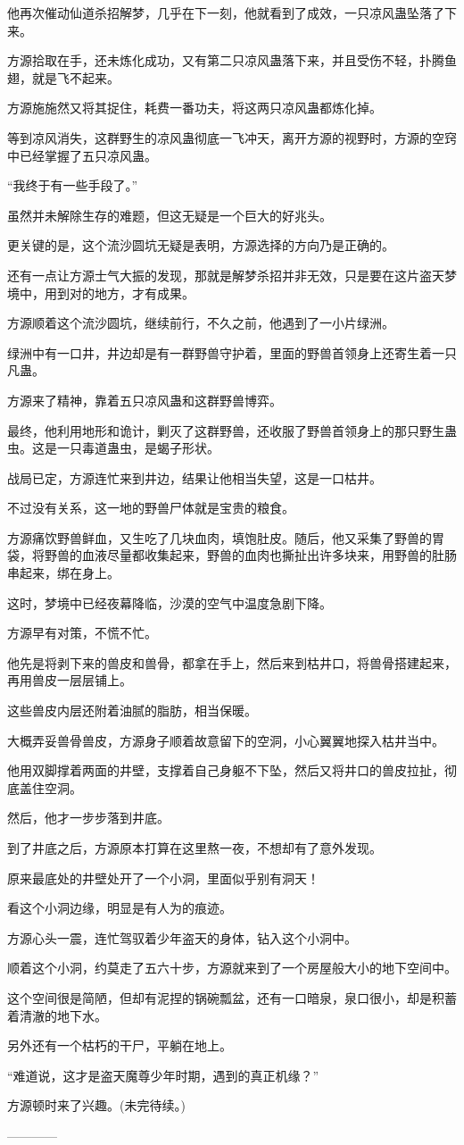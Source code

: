 \begin{this_body}
他再次催动仙道杀招解梦，几乎在下一刻，他就看到了成效，一只凉风蛊坠落了下来。

方源拾取在手，还未炼化成功，又有第二只凉风蛊落下来，并且受伤不轻，扑腾鱼翅，就是飞不起来。

方源施施然又将其捉住，耗费一番功夫，将这两只凉风蛊都炼化掉。

等到凉风消失，这群野生的凉风蛊彻底一飞冲天，离开方源的视野时，方源的空窍中已经掌握了五只凉风蛊。

“我终于有一些手段了。”

虽然并未解除生存的难题，但这无疑是一个巨大的好兆头。

更关键的是，这个流沙圆坑无疑是表明，方源选择的方向乃是正确的。

还有一点让方源士气大振的发现，那就是解梦杀招并非无效，只是要在这片盗天梦境中，用到对的地方，才有成果。

方源顺着这个流沙圆坑，继续前行，不久之前，他遇到了一小片绿洲。

绿洲中有一口井，井边却是有一群野兽守护着，里面的野兽首领身上还寄生着一只凡蛊。

方源来了精神，靠着五只凉风蛊和这群野兽博弈。

最终，他利用地形和诡计，剿灭了这群野兽，还收服了野兽首领身上的那只野生蛊虫。这是一只毒道蛊虫，是蝎子形状。

战局已定，方源连忙来到井边，结果让他相当失望，这是一口枯井。

不过没有关系，这一地的野兽尸体就是宝贵的粮食。

方源痛饮野兽鲜血，又生吃了几块血肉，填饱肚皮。随后，他又采集了野兽的胃袋，将野兽的血液尽量都收集起来，野兽的血肉也撕扯出许多块来，用野兽的肚肠串起来，绑在身上。

这时，梦境中已经夜幕降临，沙漠的空气中温度急剧下降。

方源早有对策，不慌不忙。

他先是将剥下来的兽皮和兽骨，都拿在手上，然后来到枯井口，将兽骨搭建起来，再用兽皮一层层铺上。

这些兽皮内层还附着油腻的脂肪，相当保暖。

大概弄妥兽骨兽皮，方源身子顺着故意留下的空洞，小心翼翼地探入枯井当中。

他用双脚撑着两面的井壁，支撑着自己身躯不下坠，然后又将井口的兽皮拉扯，彻底盖住空洞。

然后，他才一步步落到井底。

到了井底之后，方源原本打算在这里熬一夜，不想却有了意外发现。

原来最底处的井壁处开了一个小洞，里面似乎别有洞天！

看这个小洞边缘，明显是有人为的痕迹。

方源心头一震，连忙驾驭着少年盗天的身体，钻入这个小洞中。

顺着这个小洞，约莫走了五六十步，方源就来到了一个房屋般大小的地下空间中。

这个空间很是简陋，但却有泥捏的锅碗瓢盆，还有一口暗泉，泉口很小，却是积蓄着清澈的地下水。

另外还有一个枯朽的干尸，平躺在地上。

“难道说，这才是盗天魔尊少年时期，遇到的真正机缘？”

方源顿时来了兴趣。(未完待续。)

------------

\end{this_body}

